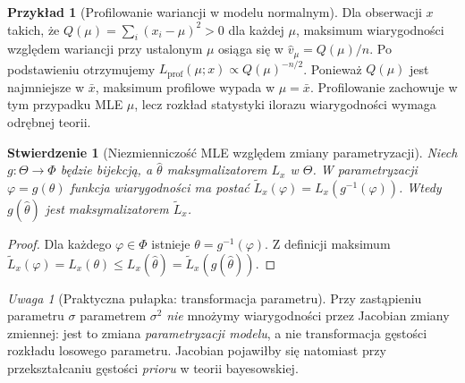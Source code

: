 \documentclass[11pt,a4paper,oneside]{report}
\numberwithin{equation}{chapter}
\theoremstyle{plain}
\newtheorem{stwierdzenie}[twierdzenie]{Stwierdzenie}
\theoremstyle{definition}
\newtheorem{przyklad}{Przykład}[chapter]
\theoremstyle{remark}
\newtheorem{uwaga}{Uwaga}[chapter]
\begin{document}
\begin{przyklad}[Profilowanie wariancji w modelu normalnym]
Dla obserwacji $x$ takich, że $Q(\mu)=\sum_i(x_i-\mu)^2>0$
dla każdej $\mu$, maksimum wiarygodności względem wariancji przy ustalonym
$\mu$ osiąga się w $\widehat v_\mu=Q(\mu)/n$. Po podstawieniu
otrzymujemy $L_{\mathrm{prof}}(\mu;x)\propto Q(\mu)^{-n/2}$.
Ponieważ $Q(\mu)$ jest najmniejsze w $\bar x$, maksimum profilowe
wypada w $\mu=\bar x$. Profilowanie zachowuje w tym przypadku MLE $\mu$,
lecz rozkład statystyki ilorazu wiarygodności wymaga odrębnej teorii.
\end{przyklad}

\begin{stwierdzenie}[Niezmienniczość MLE względem zmiany parametryzacji]
Niech $g:\Theta\to\Phi$ będzie bijekcją, a $\widehat\theta$ maksymalizatorem
$L_x$ w $\Theta$. W parametryzacji $\varphi=g(\theta)$ funkcja wiarygodności
ma postać $\widetilde L_x(\varphi)=L_x(g^{-1}(\varphi))$.
Wtedy $g(\widehat\theta)$ jest maksymalizatorem $\widetilde L_x$.
\end{stwierdzenie}
\begin{proof}
Dla każdego $\varphi\in\Phi$ istnieje $\theta=g^{-1}(\varphi)$.
Z definicji maksimum
$\widetilde L_x(\varphi)=L_x(\theta)\le L_x(\widehat\theta)
=\widetilde L_x(g(\widehat\theta))$.
\end{proof}

\begin{uwaga}[Praktyczna pułapka: transformacja parametru]
Przy zastąpieniu parametru $\sigma$ parametrem $\sigma^2$ \emph{nie}
mnożymy wiarygodności przez Jacobian zmiany zmiennej: jest to zmiana
\emph{parametryzacji modelu}, a nie transformacja gęstości rozkładu
losowego parametru. Jacobian pojawiłby się natomiast przy przekształcaniu
gęstości \emph{prioru} w teorii bayesowskiej.
\end{uwaga}
\end{document}
